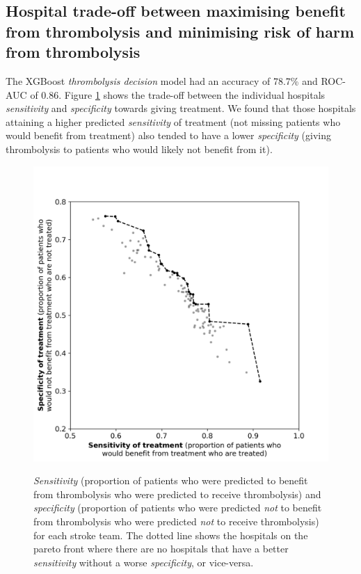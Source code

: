 \subsection{Hospital trade-off between maximising benefit from thrombolysis and minimising risk of harm from thrombolysis}

The XGBoost \textit{thrombolysis decision} model had an accuracy of 78.7\% and ROC-AUC of 0.86. Figure \ref{fig:hosp_shap_scatter} shows the trade-off between the individual hospitals \textit{sensitivity} and \textit{specificity} towards giving treatment. We found that those hospitals attaining a higher predicted \textit{sensitivity} of treatment (not missing patients who would benefit from treatment) also tended to have a lower \textit{specificity} (giving thrombolysis to patients who would likely not benefit from it).


\begin{figure}
    \centering
    {\includegraphics[width=0.65\linewidth]{./images/p4_spec_sens}} 
    \caption{\textit{Sensitivity} (proportion of patients who were predicted to benefit from thrombolysis who were predicted to receive thrombolysis) and \textit{specificity} (proportion of patients who were predicted \textit{not} to benefit from thrombolysis who were predicted \textit{not} to receive thrombolysis) for each stroke team. The dotted line shows the hospitals on the pareto front where there are no hospitals that have a better \textit{sensitivity} without a worse \textit{specificity}, or vice-versa.}
    \label{fig:hosp_shap_scatter}
\end{figure}


